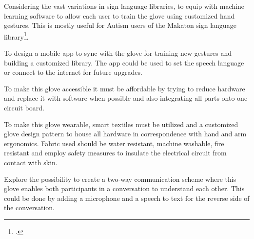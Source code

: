 Considering the vast variations in sign language libraries, to equip with machine learning software to allow each user to train the glove using customized hand gestures. This is mostly useful for Autism users of the Makaton sign language library\footcite{Makaton}. 

To design a mobile app to sync with the glove for training new gestures and building a customized library. The app could be used to set the speech language or connect to the internet for future upgrades.

To make this glove accessible it must be affordable by trying to reduce hardware and replace it with software when possible and also integrating all parts onto one circuit board. 

To make this glove wearable, smart textiles must be utilized and a customized glove design pattern to house all hardware in correspondence with hand and arm ergonomics. Fabric used should be water resistant, machine washable, fire resistant and employ safety measures to insulate the electrical circuit from contact with skin. 

Explore the possibility to create a two-way communication scheme where this glove enables both participants in a conversation to understand each other. This could be done by adding a microphone and a speech to text for the reverse side of the conversation. 